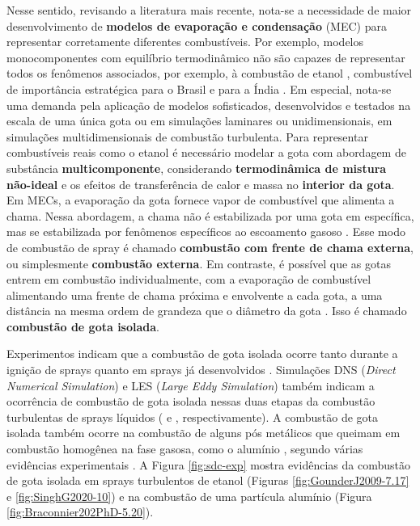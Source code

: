 Nesse sentido, revisando a literatura mais recente, nota-se a necessidade de maior desenvolvimento de \textbf{modelos de evaporação e condensação} (MEC) para representar corretamente diferentes combustíveis.
Por exemplo, modelos monocomponentes com equilíbrio termodinâmico não são capazes de representar todos os fenômenos associados, por exemplo, à combustão de etanol \cite{SacomanoF2024CF}, combustível de importância estratégica para o Brasil e para a Índia \cite{etanol-BNDES,etanol-India}.
Em especial, nota-se uma demanda pela aplicação de modelos sofisticados, desenvolvidos e testados na escala de uma única gota ou em simulações
laminares ou unidimensionais, em simulações multidimensionais de combustão turbulenta.
Para representar combustíveis reais como o etanol é necessário modelar a gota com abordagem de substância \textbf{multicomponente}, considerando \textbf{termodinâmica de mistura não-ideal} e os efeitos de transferência de calor e massa no \textbf{interior da gota}.
Em MECs, a evaporação da gota fornece vapor de combustível que alimenta a chama.
Nessa abordagem, a chama não é estabilizada por uma gota em específica, mas se estabilizada por fenômenos específicos ao escoamento gasoso \cite{ChiuH1982,Law2006}.
Esse modo de combustão de spray é chamado \textbf{combustão com frente de chama externa}, ou simplesmente \textbf{combustão externa}.
Em contraste, é possível que as gotas entrem em combustão individualmente, com a evaporação de combustível alimentando uma frente de chama próxima e envolvente a cada gota, a uma distância na mesma ordem de grandeza que o diâmetro da gota \cite{ChiuH1977}.
Isso é chamado \textbf{combustão de gota isolada}.

Experimentos indicam que a combustão de gota isolada ocorre tanto durante a ignição	de sprays \cite{AggarwalS2014} quanto em sprays já desenvolvidos \cite{ChenG1996CF,SinghG2020,GounderJ2009PhD}.
Simulações DNS (\emph{Direct Numerical Simulation}) e LES (\emph{Large Eddy Simulation}) também indicam a ocorrência de combustão de gota isolada nessas duas etapas da combustão turbulentas de sprays líquidos (\cite{BorghesiG2013CF} e \cite{PaulhiacD2020,BojkoDesJardin2017CF}, respectivamente).
A combustão de gota isolada também ocorre na combustão de alguns pós metálicos que queimam em combustão homogênea na fase gasosa, como o alumínio \cite{Bergthorson2015,Julien2017,Baumann2020}, segundo várias evidências experimentais \cite{Braconnier2020Pre,Braconnier2022,Bucher1999,Halter2023}.
A Figura \ref{fig:sdc-exp} mostra evidências da combustão de gota isolada em sprays turbulentos de etanol (Figuras \ref{fig:GounderJ2009-7.17} e \ref{fig:SinghG2020-10}) e na combustão de uma partícula alumínio (Figura \ref{fig:Braconnier202PhD-5.20}). %

